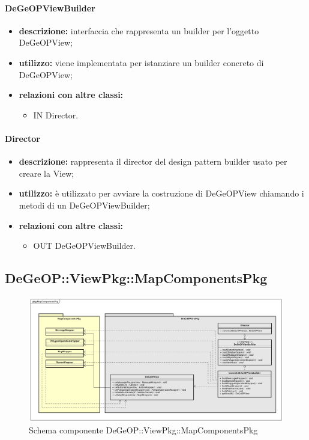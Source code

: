 \paragraph{DeGeOPViewBuilder}
\begin{itemize}
	\item \textbf{descrizione:} interfaccia che rappresenta un builder per l'oggetto DeGeOPView;
	\item \textbf{utilizzo:} viene implementata per istanziare un builder concreto di DeGeOPView;
	\item \textbf{relazioni con altre classi:} 
	\begin{itemize}
		\item IN Director.
	\end{itemize}
\end{itemize}
\paragraph{Director}
\begin{itemize}
	\item \textbf{descrizione:} rappresenta il director del design pattern builder usato per creare la View;
	\item \textbf{utilizzo:} è utilizzato per avviare la costruzione di DeGeOPView chiamando i metodi di un DeGeOPViewBuilder;
	\item \textbf{relazioni con altre classi:} 
	\begin{itemize}
		\item OUT DeGeOPViewBuilder.
	\end{itemize}
\end{itemize}
\newpage
\subsection{DeGeOP::ViewPkg::MapComponentsPkg}
\label{pkg::MapComponentsPkg}
\begin{figure}[H]
	\centering
	\includegraphics[width=\textwidth]{img/PkgDiagram/MapComponentsPkg.png}
	\caption{Schema componente DeGeOP::ViewPkg::MapComponentsPkg}
\end{figure}
